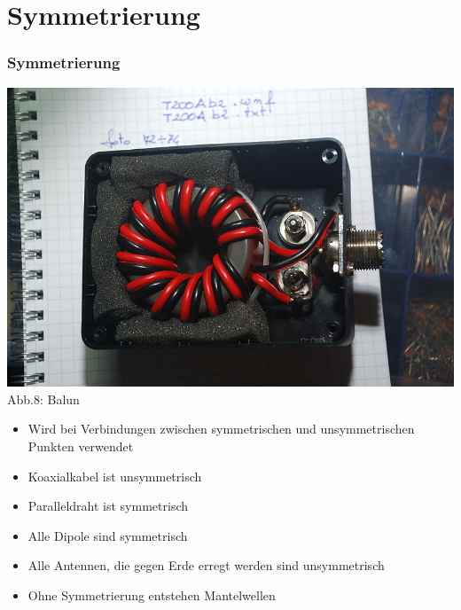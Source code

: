 \section*{Symmetrierung}
\begin{frame}
  \frametitle{Symmetrierung}
  \begin{minipage}{0.3\textwidth}
    \includegraphics[width=\textwidth,height=.8\textheight,keepaspectratio]{a10/balun.jpg}\\
    {\tiny Abb.8: Balun \cite{wp}}
  \end{minipage}
  \hspace{2mm}
  \begin{minipage}{0.5\textwidth}
    \begin{itemize}
      \item Wird bei Verbindungen zwischen symmetrischen und unsymmetrischen Punkten verwendet
      \item Koaxialkabel ist unsymmetrisch
      \item Paralleldraht ist symmetrisch
      \item Alle Dipole sind symmetrisch
      \item Alle Antennen, die gegen Erde erregt werden sind unsymmetrisch
      \item Ohne Symmetrierung entstehen Mantelwellen
    \end{itemize}
  \end{minipage}
\end{frame}

